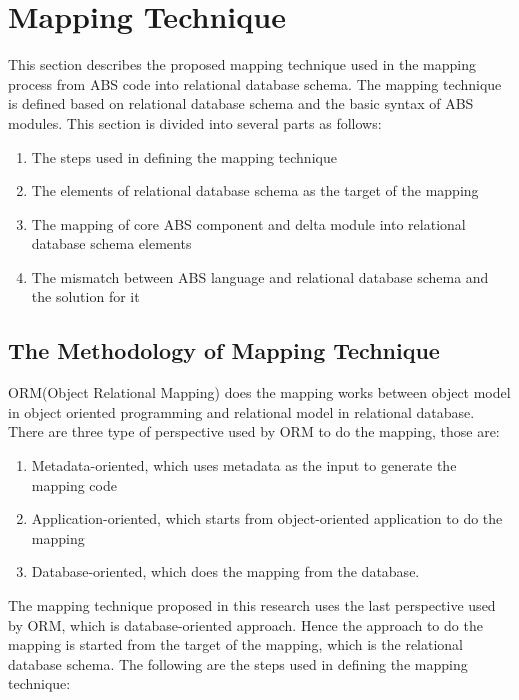 \documentclass[conference]{IEEEtran}
\begin{document}
\section{Mapping Technique}
This section describes the proposed mapping technique used in the mapping process from ABS code into relational database schema. The mapping technique is defined based on relational database schema and the basic syntax of ABS modules. This section is divided into several parts as follows:
\begin{enumerate}
	\item The steps used in defining the mapping technique
	\item The elements of relational database schema as the target of the mapping
	\item The mapping of core ABS component and delta module into relational database schema elements
	\item The mismatch between ABS language and relational database schema and the solution for it
\end{enumerate}

\subsection{The Methodology of Mapping Technique}
ORM(Object Relational Mapping) does the mapping works between object model in object oriented programming and relational model in relational database. There are three type of perspective used by ORM to do the mapping, those are:
\begin{enumerate}
	\item Metadata-oriented, which uses metadata as the input to generate the mapping code
	\item Application-oriented, which starts from object-oriented application to do the mapping
	\item Database-oriented, which does the mapping from the database.
\end{enumerate}

The mapping technique proposed in this research uses the last perspective used by ORM, which is database-oriented approach. Hence the approach to do the mapping is started from the target of the mapping, which is the relational database schema. The following are the steps used in defining the mapping technique:
\end{document}
